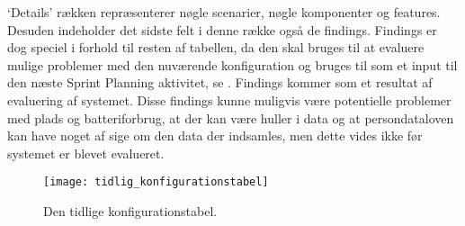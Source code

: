 `Details' rækken repræsenterer nøgle scenarier, nøgle komponenter og features.
Desuden indeholder det sidste felt i denne række også de findings.
Findings er dog speciel i forhold til resten af tabellen, da den skal bruges til at evaluere mulige problemer med den nuværende konfiguration og bruges til som et input til den næste Sprint Planning aktivitet, se \citet[Afsnit 8.5, Side 54]{art:essence}. 
Findings kommer som et resultat af evaluering af systemet. 
Disse findings kunne muligvis være potentielle problemer med plads og batteriforbrug, at der kan være huller i data og at persondataloven kan have noget af sige om den data der indsamles, men dette vides ikke før systemet er blevet evalueret. 

\begin{figure}
	\texttt{[image: tidlig\_konfigurationstabel]}
	\caption{Den tidlige konfigurationstabel.}
	\label{tidlig_konfigurationstabel}
\end{figure}